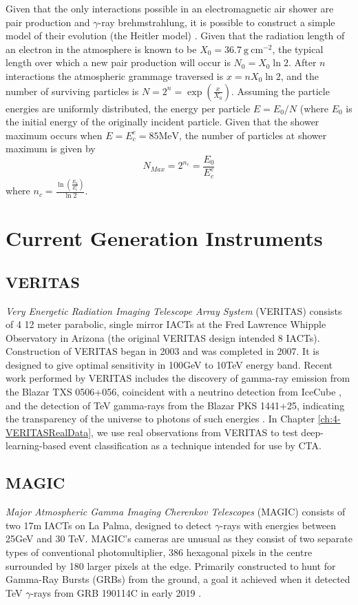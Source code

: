 Given that the only interactions possible in an electromagnetic air shower are pair production and $\gamma$-ray brehmstrahlung, it is possible to construct a simple model of their evolution (the Heitler model) \cite{heitler}. Given that the radiation length of an electron in the atmosphere is known to be $X_0=\mathrm{36.7\ g\ cm^{-2}}$, the typical length over which a new pair production will occur is $N_0=X_0 \ln 2$. After $n$ interactions the atmospheric grammage traversed is $x=nX_0 \ln 2$, and the number of surviving particles is $N=2^n=\exp \left( \frac{x}{X_0}\right)$. Assuming the particle energies are uniformly distributed, the energy per particle $E=E_0/N$ (where $E_0$ is the initial energy of the originally incident particle. Given that the shower maximum occurs when $E=E_c^e=\mathrm{85 MeV}$, the number of particles at shower maximum is given by 
\begin{equation}
    N_{Max}=2^{n_c}=\frac{E_0}{E_c^e}
\end{equation}
where $n_c=\frac{\ln (\frac{E_0}{E_e^c})}{\ln 2}$.
\section{Current Generation Instruments}
\subsection{VERITAS}
\textit{Very Energetic Radiation Imaging Telescope Array System} (VERITAS) consists of 4 12 meter parabolic, single mirror IACTs at the Fred Lawrence Whipple Observatory in Arizona (the original VERITAS design intended 8 IACTs). Construction of VERITAS began in 2003 and was completed in 2007. It is designed to give optimal sensitivity in 100GeV to 10TeV energy band. Recent work performed by VERITAS includes the discovery of gamma-ray emission from the Blazar TXS 0506+056, coincident with a neutrino detection from IceCube \cite{TXS}, and the detection of TeV gamma-rays from the Blazar PKS 1441+25, indicating the transparency of the universe to photons of such energies \cite{escape}. In Chapter \ref{ch:4-VERITASRealData}, we use real observations from VERITAS to test deep-learning-based event classification as a technique intended for use by CTA.

\subsection{MAGIC}
\textit{Major Atmospheric Gamma Imaging Cherenkov Telescopes} (MAGIC) consists of two 17m IACTs on La Palma, designed to detect $\gamma$-rays with energies between 25GeV and 30 TeV. MAGIC's cameras are unusual as they consist of two separate types of conventional photomultiplier, 386 hexagonal pixels in the centre surrounded by 180 larger pixels at the edge. Primarily constructed to hunt for Gamma-Ray Bursts (GRBs) from the ground, a goal it achieved when it detected TeV $\gamma$-rays from GRB 190114C in early 2019 \cite{magicGRB}.
